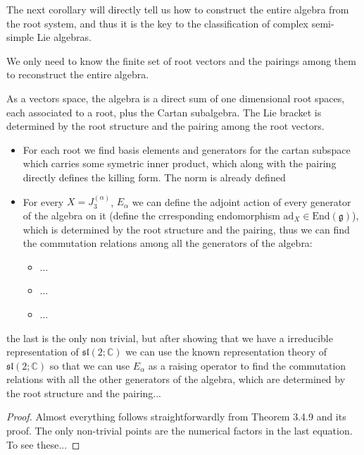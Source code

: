 The next corollary will directly tell us how to construct the entire algebra from the root system, and thus it is the key to the classification of complex semi-simple Lie algebras.

\begin{corollary}
    We only need to know the finite set of root vectors and the pairings among them to reconstruct the entire algebra.

    As a vectors space, the algebra is a direct sum of one dimensional root spaces, each associated to a root, plus the Cartan subalgebra. The Lie bracket is determined by the root structure and the pairing among the root vectors.

    \begin{itemize}
        \item For each root we find basis elements and generators for the cartan subspace which carries some symetric inner product, which along with the pairing directly defines the killing form. The norm is already defined

        \item For every \(X = J_3^{(\alpha)}\), \(E_{\alpha}\) we can define the adjoint action of every generator of the algebra on it (define the crresponding endomorphism \(\mathrm{ad}_X \in \mathrm{End}(\mathfrak{g})\)), which is determined by the root structure and the pairing, thus we can find the commutation relations among all the generators of the algebra:
              \begin{itemize}
                  \item \(\dots \)
                  \item \(\dots \)
                  \item \(\dots \)
              \end{itemize}
    \end{itemize}
\end{corollary}
the last is the only non trivial, but after showing that we have a irreducible representation of \(\mathfrak{sl}(2; \mathbb{C})\) we can use the known representation theory of \(\mathfrak{sl}(2; \mathbb{C})\) so that we can use \(E_{\alpha} \) as a raising operator to find the commutation relations with all the other generators of the algebra, which are determined by the root structure and the pairing...
\begin{proof}
    Almost everything follows straightforwardly from Theorem 3.4.9 and its proof. The only non-trivial points are the numerical factors in the last equation. To see these...
\end{proof}

